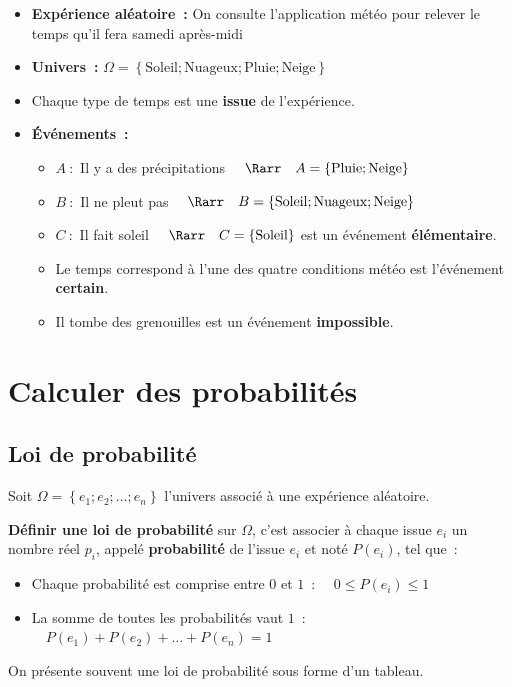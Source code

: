 \begin{ex}
	\nline
	\begin{itemize}
		\item \textbf{Expérience aléatoire~:} \og On consulte l'application météo pour relever le temps qu'il fera samedi après-midi \fg{}
		\item \textbf{Univers~:} $\Omega = \left\{ \text{Soleil} ; \text{Nuageux} ; \text{Pluie} ; \text{Neige} \right\}$
		\item Chaque type de temps est une \textbf{issue} de l'expérience.
		\item \textbf{Événements~:}
		      \begin{itemize}
			      \item $A~:$ \og Il y a des précipitations \fg{} $\quad\Rarr\quad A = \left\{ \text{Pluie} ; \text{Neige} \right\}$
			      \item $B~:$ \og Il ne pleut pas \fg{} $\quad\Rarr\quad B = \left\{ \text{Soleil} ; \text{Nuageux} ; \text{Neige} \right\}$
			      \item $C~:$ \og Il fait soleil \fg{} $\quad\Rarr\quad C = \left\{ \text{Soleil} \right\}$ est un événement \textbf{élémentaire}.
			      \item \og Le temps correspond à l'une des quatre conditions météo \fg{} est l'événement \textbf{certain}.
			      \item \og Il tombe des grenouilles \fg{} est un événement \textbf{impossible}.
		      \end{itemize}
	\end{itemize}
\end{ex}

\section{Calculer des probabilités}

\subsection{Loi de probabilité}

\begin{defin}
	Soit $\Omega = \left\{ e_1 ; e_2 ; \ldots ; e_n \right\}$ l'univers associé à une expérience aléatoire.

	\textbf{Définir une loi de probabilité} sur $\Omega$, c'est associer à chaque issue $e_i$ un nombre réel $p_i$, appelé \textbf{probabilité} de l'issue $e_i$ et noté $P(e_i)$, tel que~:

	\begin{itemize}
		\item Chaque probabilité est comprise entre $0$ et $1$~: $\quad 0 \le P(e_i) \le 1$
		\item La somme de toutes les probabilités vaut $1$~: $\quad P(e_1) + P(e_2) + \ldots + P(e_n) = 1$
	\end{itemize}

	On présente souvent une loi de probabilité sous forme d'un tableau.
\end{defin}


